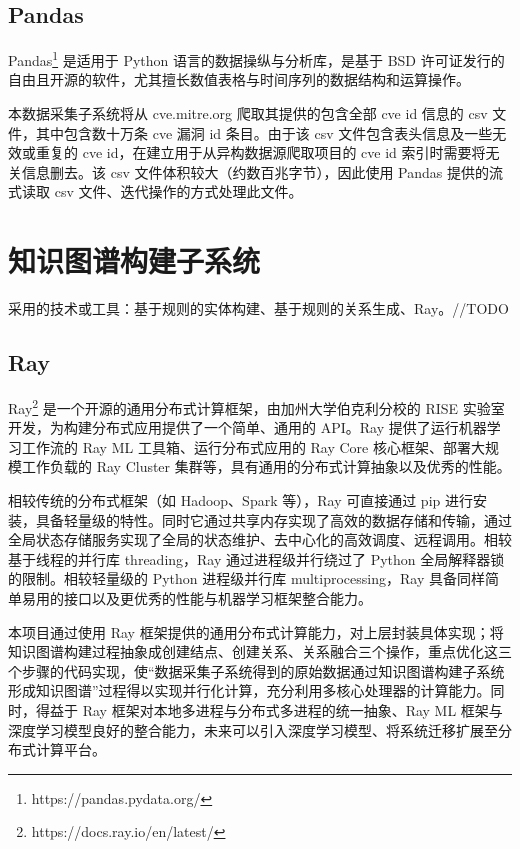 \documentclass[a4paper,AutoFakeBold,oneside,12pt]{book}
\begin{document}
\subsection{Pandas}

Pandas\footnote{https://pandas.pydata.org/} 是适用于 Python 语言的数据操纵与分析库，是基于 BSD 许可证发行的自由且开源的软件，尤其擅长数值表格与时间序列的数据结构和运算操作。

本数据采集子系统将从 cve.mitre.org 爬取其提供的包含全部 cve id 信息的 csv 文件，其中包含数十万条 cve 漏洞 id 条目。由于该 csv 文件包含表头信息及一些无效或重复的 cve id，在建立用于从异构数据源爬取项目的 cve id 索引时需要将无关信息删去。该 csv 文件体积较大（约数百兆字节），因此使用 Pandas 提供的流式读取 csv 文件、迭代操作的方式处理此文件。

\section{知识图谱构建子系统}

采用的技术或工具：基于规则的实体构建、基于规则的关系生成、Ray。//TODO

\subsection{Ray}

Ray\footnote{https://docs.ray.io/en/latest/} 是一个开源的通用分布式计算框架，由加州大学伯克利分校的 RISE 实验室开发，为构建分布式应用提供了一个简单、通用的 API。Ray 提供了运行机器学习工作流的 Ray ML 工具箱、运行分布式应用的 Ray Core 核心框架、部署大规模工作负载的 Ray Cluster 集群等，具有通用的分布式计算抽象以及优秀的性能。

相较传统的分布式框架（如 Hadoop、Spark 等），Ray 可直接通过 pip 进行安装，具备轻量级的特性。同时它通过共享内存实现了高效的数据存储和传输，通过全局状态存储服务实现了全局的状态维护、去中心化的高效调度、远程调用。相较基于线程的并行库  threading，Ray 通过进程级并行绕过了 Python 全局解释器锁的限制。相较轻量级的 Python 进程级并行库 multiprocessing，Ray 具备同样简单易用的接口以及更优秀的性能与机器学习框架整合能力。

本项目通过使用 Ray 框架提供的通用分布式计算能力，对上层封装具体实现；将知识图谱构建过程抽象成创建结点、创建关系、关系融合三个操作，重点优化这三个步骤的代码实现，使“数据采集子系统得到的原始数据通过知识图谱构建子系统形成知识图谱”过程得以实现并行化计算，充分利用多核心处理器的计算能力。同时，得益于 Ray 框架对本地多进程与分布式多进程的统一抽象、Ray ML 框架与深度学习模型良好的整合能力，未来可以引入深度学习模型、将系统迁移扩展至分布式计算平台。
\end{document}
